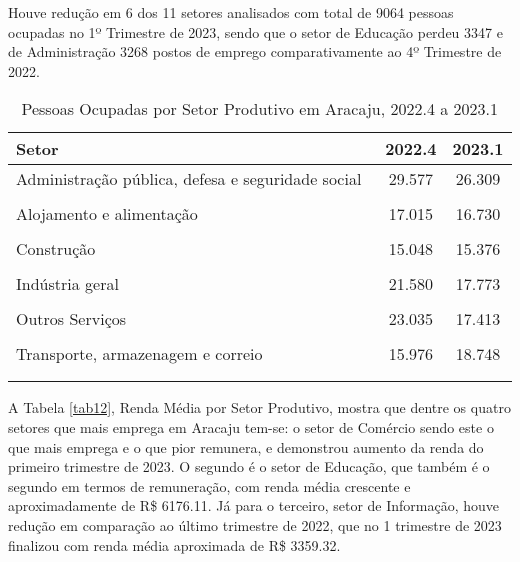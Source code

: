 \documentclass[preprint, 3p,
authoryear]{elsarticle} %
\begin{document}
Houve redução em 6 dos 11 setores analisados com total de 9064 pessoas
ocupadas no 1º Trimestre de 2023, sendo que o setor de Educação perdeu
3347 e de Administração 3268 postos de emprego comparativamente ao 4º
Trimestre de 2022.

\begingroup\fontsize{9}{11}\selectfont

\begin{longtable}[t]{>{\raggedright\arraybackslash}p{13.3cm}cc}
\caption{\label{tab:tab11}\label{tab11}Pessoas Ocupadas por Setor Produtivo em Aracaju, 2022.4 a 2023.1}\\
\toprule
Setor & 2022.4 & 2023.1\\
\midrule
Administração pública, defesa e seguridade social  & 29.577 & 26.309\\
\cellcolor[HTML]{DCDCDC}{Agricultura, pecuária, produção florestal, pesca e aquicultura} & \cellcolor[HTML]{DCDCDC}{1.452} & \cellcolor[HTML]{DCDCDC}{734}\\
Alojamento e alimentação  & 17.015 & 16.730\\
\cellcolor[HTML]{DCDCDC}{Comércio, reparação de veículos automotores e motocicletas} & \cellcolor[HTML]{DCDCDC}{66.814} & \cellcolor[HTML]{DCDCDC}{67.780}\\
Construção & 15.048 & 15.376\\
\addlinespace
\cellcolor[HTML]{DCDCDC}{Educação, saúde humana e serviços sociais} & \cellcolor[HTML]{DCDCDC}{62.700} & \cellcolor[HTML]{DCDCDC}{59.353}\\
Indústria geral & 21.580 & 17.773\\
\cellcolor[HTML]{DCDCDC}{Informação, comunicação e atividades financeiras, imobiliárias, profissionais e administrativas} & \cellcolor[HTML]{DCDCDC}{44.676} & \cellcolor[HTML]{DCDCDC}{46.710}\\
Outros Serviços & 23.035 & 17.413\\
\cellcolor[HTML]{DCDCDC}{Serviços domésticos} & \cellcolor[HTML]{DCDCDC}{12.283} & \cellcolor[HTML]{DCDCDC}{14.166}\\
\addlinespace
Transporte, armazenagem e correio  & 15.976 & 18.748\\
\bottomrule
\multicolumn{3}{l}{\rule{0pt}{1em}\textit{Fonte: IBGE (2023).}}\\
\multicolumn{3}{l}{\rule{0pt}{1em}}\\
\end{longtable}
\endgroup{}

A Tabela \ref{tab12}, Renda Média por Setor Produtivo, mostra que dentre
os quatro setores que mais emprega em Aracaju tem-se: o setor de
Comércio sendo este o que mais emprega e o que pior remunera, e
demonstrou aumento da renda do primeiro trimestre de 2023. O segundo é o
setor de Educação, que também é o segundo em termos de remuneração, com
renda média crescente e aproximadamente de R\$ 6176.11. Já para o
terceiro, setor de Informação, houve redução em comparação ao último
trimestre de 2022, que no 1 trimestre de 2023 finalizou com renda média
aproximada de R\$ 3359.32.
\end{document}
